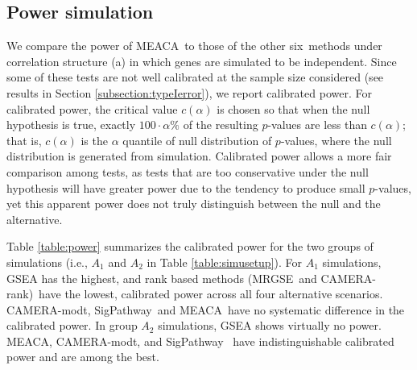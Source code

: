 \documentclass[a4,center,fleqn]{NAR}
\newcommand{\OurMethod}{MEACA}
\newcommand{\HowmanyTest}{six}
\newcommand{\aaCase}{a}
\newcommand{\CMR}{CAMERA-rank}
\newcommand{\CMT}{CAMERA-modt}
\newcommand{\gent}{SigPathway}
\newcommand{\genr}{MRGSE}
\begin{document}
	
	\subsection{Power simulation}\label{subsection:power}		 
	
	We compare the power of \OurMethod~to those of the other \HowmanyTest~methods under correlation 
	structure (\aaCase) in which genes are simulated to be independent. 
	Since some of these tests are not well calibrated at the sample size
	considered (see results in Section \ref{subsection:typeIerror}), we report calibrated power. For
	calibrated power, the critical value $c(\alpha)$ is chosen so that when the null hypothesis is 
	true, exactly $100\cdot\alpha\%$ of the resulting $p$-values are less than $c(\alpha)$; that is,
	$c(\alpha)$ is  the $\alpha$ quantile of null distribution of $p$-values, where the null
	distribution is generated from simulation. Calibrated power allows a more fair comparison among
	tests, as tests that are too conservative under the null hypothesis will have greater power due 
	to the tendency to produce small $p$-values, yet this apparent power does not truly distinguish 
	between the null and the alternative.  
	
	Table \ref{table:power} summarizes the calibrated power for the two groups of simulations (i.e.,
	$A_1$ and $A_2$ in Table \ref{table:simusetup}). %
	For $A_1$ simulations, GSEA has the highest, and rank based methods (\genr~and \CMR)~have the
	lowest, calibrated power across all four alternative scenarios. \CMT, \gent~and \OurMethod~have 
	no systematic difference in the calibrated power. %
	In group $A_2$ simulations, GSEA shows virtually no power. \OurMethod, \CMT, and \gent~ have
	indistinguishable calibrated power and are among the best.
	
\end{document}
